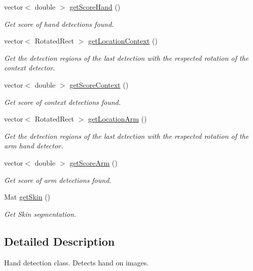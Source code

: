 \begin{DoxyCompactItemize}
vector$<$ double $>$ \hyperlink{class_det_hand_abb8015c29b1e4c6bf78ebe8bf87f49cd}{get\-Score\-Hand} ()
\begin{DoxyCompactList}\small\item\em Get score of hand detections found. \end{DoxyCompactList}\item 
vector$<$ Rotated\-Rect $>$ \hyperlink{class_det_hand_a22212d11ca6da3294e65a69d3438516c}{get\-Location\-Context} ()
\begin{DoxyCompactList}\small\item\em Get the detection regions of the last detection with the respected rotation of the context detector. \end{DoxyCompactList}\item 
vector$<$ double $>$ \hyperlink{class_det_hand_a66591d156dcb9ae702ec5bff58aff404}{get\-Score\-Context} ()
\begin{DoxyCompactList}\small\item\em Get score of context detections found. \end{DoxyCompactList}\item 
vector$<$ Rotated\-Rect $>$ \hyperlink{class_det_hand_a968add655757ec16229a217e6981ed1d}{get\-Location\-Arm} ()
\begin{DoxyCompactList}\small\item\em Get the detection regions of the last detection with the respected rotation of the arm hand detector. \end{DoxyCompactList}\item 
vector$<$ double $>$ \hyperlink{class_det_hand_aecc3b2a3541650dbbfeac38887ac1a61}{get\-Score\-Arm} ()
\begin{DoxyCompactList}\small\item\em Get score of arm detections found. \end{DoxyCompactList}\item 
Mat \hyperlink{class_det_hand_a0f824a1a3414cc612cbd475f901fd0b5}{get\-Skin} ()
\begin{DoxyCompactList}\small\item\em Get Skin segmentation. \end{DoxyCompactList}\end{DoxyCompactItemize}


\subsection{Detailed Description}
Hand detection class. Detects hand on images.

